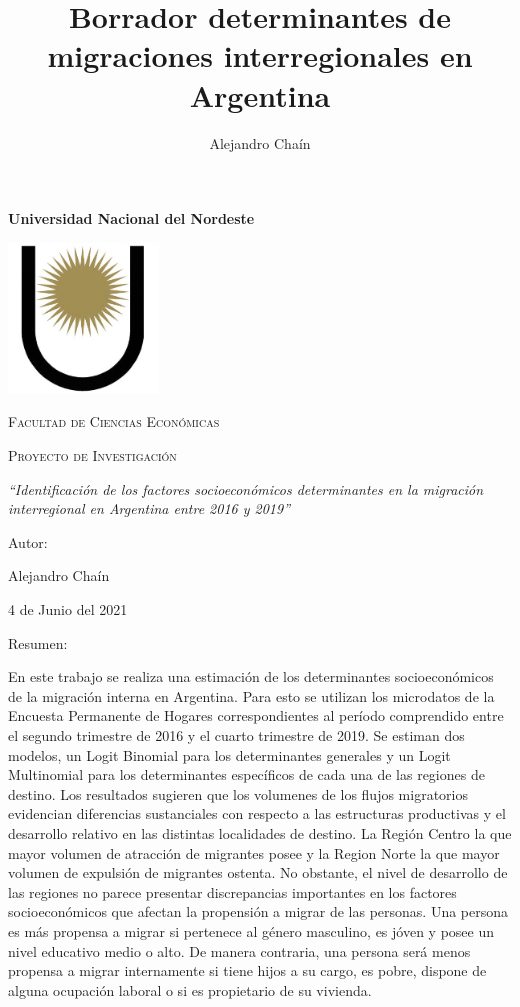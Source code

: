 \documentclass[12pt,a4paper]{article}
\author{Alejandro Chaín}
\title{Borrador determinantes de migraciones interregionales en Argentina}
\begin{document}
\begin{titlepage}
\centering
\vspace{3cm}
{\bfseries\LARGE Universidad Nacional del Nordeste\par}
\vspace{1cm}
{\includegraphics[width=0.3\textwidth]{logounne.png}\par}
{\scshape\Large Facultad de Ciencias Econ\'omicas\par}
\vspace{2cm}
{\scshape\Huge Proyecto de Investigación \par}
\vspace{2cm}
{\itshape\Large ``Identificación de los factores socioeconómicos determinantes en la migración
interregional en Argentina entre 2016 y 2019'' \par}
\vfill
{\Large Autor: \par}
{\Large Alejandro Chaín\par}
\vfill
{\Large 4 de Junio del 2021 \par}
\end{titlepage}

\newpage
\begin{center}
Resumen:
\end{center}
En este trabajo se realiza una estimación de los determinantes socioeconómicos de la migración interna en Argentina. Para esto se utilizan los microdatos de
la Encuesta Permanente de Hogares correspondientes al período comprendido entre el segundo trimestre de 2016 y el cuarto trimestre de 2019. Se estiman dos modelos, un Logit Binomial para los determinantes generales y un Logit Multinomial para los determinantes específicos de cada una de las regiones de destino. Los resultados sugieren que los volumenes de los flujos migratorios evidencian diferencias sustanciales con respecto a las estructuras productivas y el desarrollo relativo en las distintas localidades de destino. La Región Centro la que mayor volumen de atracción de migrantes posee y la Region Norte la que mayor volumen de expulsión de migrantes ostenta. No obstante, el nivel de desarrollo de las regiones no parece presentar discrepancias importantes en los factores socioeconómicos que afectan la propensión a migrar de las personas. Una persona es más propensa a migrar si  pertenece al género masculino, es jóven y posee un nivel educativo medio o alto. De manera contraria, una persona será menos propensa a migrar internamente si tiene hijos a su cargo,  es pobre, dispone de alguna ocupación laboral o si es propietario de su vivienda. 
\newpage
\tableofcontents
\newpage
\end{document}

